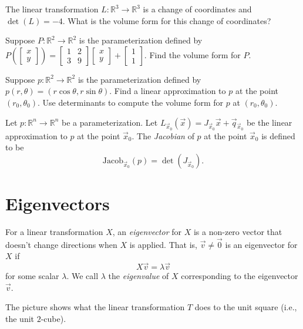 \documentclass{problemset}
\newcommand{\R}{\mathbb{R}}
\newcommand{\mat}[1]{\begin{bmatrix}#1\end{bmatrix}}
\begin{document}
	\question
	\begin{parts}
		\item The linear transformation $L:\R^3\to\R^3$ is a change of coordinates and $\det(L)=-4$.
			What is the volume form for this change of coordinates?
		\item Suppose $P:\R^2\to\R^2$ is the parameterization defined by $P\left(\mat{x\\y}\right)=\mat{1&2\\3&9}\mat{x\\y}+\mat{1\\1}$.
			Find the volume form for $P$.
		\item Suppose $p:\R^2\to\R^2$ is the parameterization defined by $p(r,\theta)=(r\cos\theta,r\sin\theta)$.  Find
			a linear approximation to $p$ at the point $(r_0,\theta_0)$.  Use determinants to compute the volume form for $p$
			at $(r_0,\theta_0)$.
	\end{parts}
	\begin{definition}[Jacobian]
		Let $p:\R^n\to\R^n$ be a parameterization.  Let $L_{\vec x_0}(\vec x) = J_{\vec x_0}\vec x+\vec q_{\vec x_0}$
		be the linear approximation to $p$ at the point $\vec x_0$.  The \emph{Jacobian} of $p$ at the point $\vec x_0$
		is defined to be
		\[
			\mathrm{Jacob}_{\vec x_0}(p) = \det(J_{\vec x_0}).
		\]
	\end{definition}


\newpage
\section*{Eigenvectors}

	\vspace{-.6cm}
	\begin{definition}[Eigenvector]
	For a linear transformation $X$, an \emph{eigenvector} for $X$ is a non-zero vector that doesn't
	change directions when $X$ is applied.  That is, $\vec v\neq \vec 0$ is an eigenvector for $X$ if
	\[
		X\vec v=\lambda \vec v
	\]
	for some scalar $\lambda$.  We call $\lambda$ the \emph{eigenvalue} 
	of $X$ corresponding
	to the eigenvector $\vec v$.
	\end{definition}
	\vspace{-.2cm}

	\question
	The picture shows what the linear transformation $T$ does to the unit square (i.e., the unit $2$-cube).
	
\end{document}
